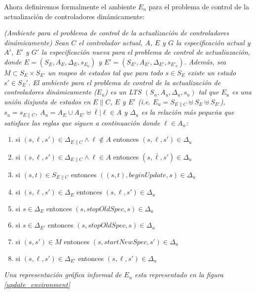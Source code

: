 Ahora definiremos formalmente el ambiente $E_u$ para el problema de control de la actualización de controladores
dinámicamente:

\begin{nahaDef}
\emph{(Ambiente para el problema de control de la actualización de controladores dinámicamente) Sean $C$ el controlador
actual, $A$, $E$ y $G$ la especificación actual y $A'$, $E'$ y $G'$ la especificación nueva para el problema de
control de actualiazación, donde $E = (S_E, A_E, \Delta_E, s_{E_0})$ y $E' = (S_{E'}, A_{E'}, \Delta_{E'}, s_{E'_0})$.
Además, sea $M \subset S_E \times S_{E'}$ un mapeo de estados tal que para todo $s \in S_E$ existe un estado $s' \in
{S_E'}$. El ambiente para el problema de control de la actualización de controladores dinámicamente ($E_u$) es un LTS
$(S_u,A_u,\Delta_u,s_u)$ tal que $E_u$ es una unión disjunta de estados en $E\|C$, $E$ y $E'$ (i.e. $E_u = S_{E\|C}
\uplus S_E \uplus S_{E'}$), $s_u = s_{E\|C}$, $A_u = A_E \cup A_{E'} \uplus \bar{\ell}|\ell \in A$ y $\Delta_u$ es la relación más
pequeña que satisface las reglas que siguen a continuación donde $\ell \in A_u$:}

\begin{enumerate}
\label{update_environment_def}
\itemsep-4mm
\renewcommand*\labelenumi{[\theenumi]}
\item si $(s,\ell,s') \in \Delta_{E\|C} \wedge \ell \notin A$ entonces $(s,\ell,s') \in \Delta_u$
\item si $(s,\ell,s') \in \Delta_{E\|C} \wedge \ell \in A$ entonces $(s,\bar{\ell},s') \in \Delta_u$
\item si $(s,t) \in S_{E\|C}$ entonces $((s,t), beginUpdate,s) \in \Delta_u$
\item si $(s,\ell,s') \in \Delta_E$ entonces $(s,\ell,s') \in \Delta_u$
\item si $s \in \Delta_E$ entonces $(s,stopOldSpec,s) \in \Delta_u$
\item si $s \in \Delta_{E'}$ entonces $(s,stopOldSpec,s) \in \Delta_u$
\item si $(s,s') \in M$ entonces $(s,startNewSpec,s') \in \Delta_u$
\item si $(s,\ell,s') \in \Delta_{E'}$ entonces $(s,\ell,s') \in \Delta_u$
\end{enumerate}
\emph{Una representación gráfica informal de $E_u$ esta representado en la figura \ref{update_environment}}
\end{nahaDef}

